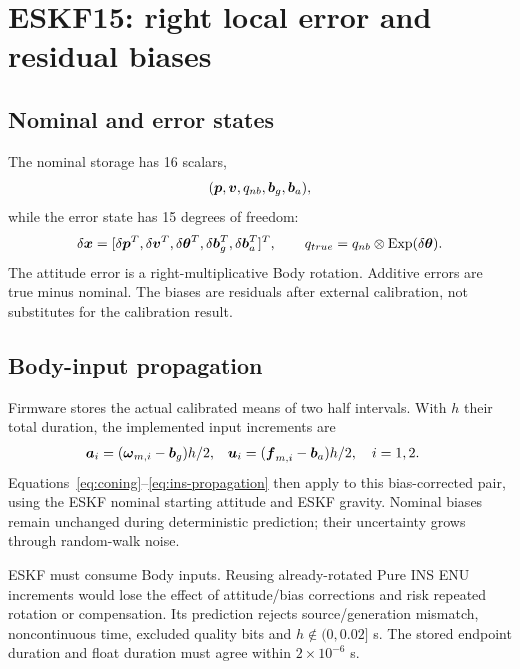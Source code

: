 \section{ESKF15: right local error and residual biases}
\label{sec:eskf}
\subsection{Nominal and error states}
The nominal storage has 16 scalars,
\begin{equation}
(\boldsymbol{p},\boldsymbol{v},q_{nb},\boldsymbol{b}_g,\boldsymbol{b}_a),
\end{equation}
while the error state has 15 degrees of freedom:
\begin{equation}
\delta\boldsymbol{x}=[\delta\boldsymbol{p}^T,\delta\boldsymbol{v}^T,\delta\boldsymbol{\theta}^T,
\delta\boldsymbol{b}_g^T,\delta\boldsymbol{b}_a^T]^T,
\qquad q_{true}=q_{nb}\otimes\operatorname{Exp}(\delta\boldsymbol{\theta}).
\label{eq:error-state}
\end{equation}
The attitude error is a right-multiplicative Body rotation. Additive errors are true minus nominal. The biases are residuals after external calibration, not substitutes for the calibration result.

\subsection{Body-input propagation}
Firmware stores the actual calibrated means of two half intervals. With $h$ their total duration, the implemented input increments are
\begin{align}
\boldsymbol{a}_i&=(\boldsymbol{\omega}_{m,i}-\boldsymbol{b}_g)h/2,&
\boldsymbol{u}_i&=(\boldsymbol{f}_{m,i}-\boldsymbol{b}_a)h/2,\quad i=1,2.
\end{align}
Equations~\eqref{eq:coning}--\eqref{eq:ins-propagation} then apply to this bias-corrected pair, using the ESKF nominal starting attitude and ESKF gravity. Nominal biases remain unchanged during deterministic prediction; their uncertainty grows through random-walk noise.

ESKF must consume Body inputs. Reusing already-rotated Pure INS ENU increments would lose the effect of attitude/bias corrections and risk repeated rotation or compensation. Its prediction rejects source/generation mismatch, noncontinuous time, excluded quality bits and $h\notin(0,0.02]$ s. The stored endpoint duration and float duration must agree within $2\times10^{-6}$ s.

